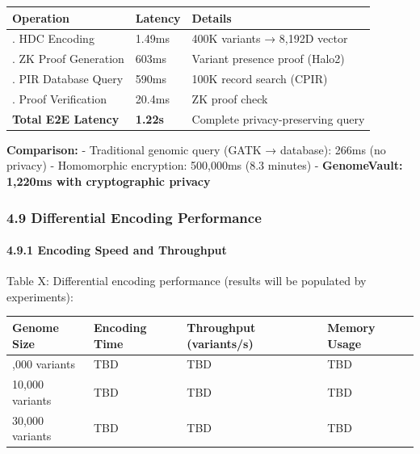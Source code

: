 \documentclass[
  11pt,
]{article}
\begin{document}
\begin{longtable}[]{@{}
  >{\raggedright\arraybackslash}p{}
  >{\raggedright\arraybackslash}p{}
  >{\raggedright\arraybackslash}p{}@{}}
\toprule\noalign{}
\begin{minipage}[b]{\linewidth}\raggedright
Operation
\end{minipage} & \begin{minipage}[b]{\linewidth}\raggedright
Latency
\end{minipage} & \begin{minipage}[b]{\linewidth}\raggedright
Details
\end{minipage} \\
\midrule\noalign{}
\endhead
\bottomrule\noalign{}
\endlastfoot
1. HDC Encoding & 1.49ms & 400K variants → 8,192D vector \\
2. ZK Proof Generation & 603ms & Variant presence proof (Halo2) \\
3. PIR Database Query & 590ms & 100K record search (CPIR) \\
4. Proof Verification & 20.4ms & ZK proof check \\
\textbf{Total E2E Latency} & \textbf{1.22s} & Complete
privacy-preserving query \\
\end{longtable}

\textbf{Comparison:} - Traditional genomic query (GATK → database):
266ms (no privacy) - Homomorphic encryption: 500,000ms (8.3 minutes) -
\textbf{GenomeVault: 1,220ms with cryptographic privacy}

\subsubsection{4.9 Differential Encoding
Performance}\label{differential-encoding-performance}

\paragraph{4.9.1 Encoding Speed and
Throughput}\label{encoding-speed-and-throughput}

Table X: Differential encoding performance (results will be populated by
experiments):

\begin{longtable}[]{@{}llll@{}}
\toprule\noalign{}
Genome Size & Encoding Time & Throughput (variants/s) & Memory Usage \\
\midrule\noalign{}
\endhead
\bottomrule\noalign{}
\endlastfoot
1,000 variants & TBD & TBD & TBD \\
10,000 variants & TBD & TBD & TBD \\
30,000 variants & TBD & TBD & TBD \\
\end{longtable}
\end{document}

